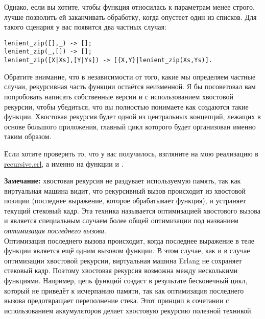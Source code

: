 Однако, если вы хотите, чтобы функция относилась к параметрам менее строго, лучше позволить ей заканчивать обработку, когда опустеет один из списков.
Для такого сценария у вас появится два частных случая:
\begin{lstlisting}[style=erlang]
lenient_zip([],_) -> [];
lenient_zip(_,[]) -> [];
lenient_zip([X|Xs],[Y|Ys]) -> [{X,Y}|lenient_zip(Xs,Ys)].
\end{lstlisting}

Обратите внимание, что в независимости от того, какие мы определяем частные случаи, рекурсивная часть функции остаётся неизменной.
Я бы посоветовал вам попробовать написать собственные версии  и  с использованием хвостовой рекурсии, чтобы убедиться, что вы полностью понимаете как создаются такие функции.
Хвостовая рекурсия будет одной из центральных концепций, лежащих в основе большого приложения, главный цикл которого будет организован именно таким образом.

Если хотите проверить то, что у вас получилось, взгляните на мою реализацию в \href{http://learnyousomeerlang.com/static/erlang/recursive.erl}{recursive.erl}, а именно на функции  и .
\colorbox{lgray}
{
    \begin{minipage}{\linewidth}
\textbf{Замечание:} хвостовая рекурсия не раздувает используемую память, так как виртуальная машина видит, что рекурсивный вызов происходит из хвостовой позиции (последнее выражение, которое обрабатывает функция), и устраняет текущий стековый кадр.
Эта техника называется оптимизацией хвостового вызова и является специальным случаем более общей оптимизации под названием \emph{оптимизация последнего вызова}.\\
Оптимизация последнего вызова происходит, когда последнее выражение в теле функции является ещё одним вызовом функции.
В этом случае, как и в случае оптимизации хвостовой рекурсии, виртуальная машина Erlang не сохраняет стековый кадр.
Поэтому хвостовая рекурсия возможна между несколькими функциями.
Например, цепь функций  создаст в результате бесконечный цикл, который не приведёт к исчерпанию памяти, так как оптимизация последнего вызова предотвращает переполнение стека.
Этот принцип в сочетании с использованием аккумуляторов делает хвостовую рекурсию полезной техникой.
    \end{minipage}
}
